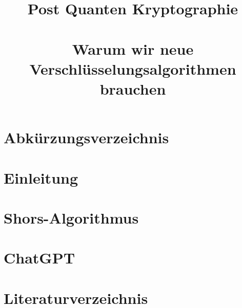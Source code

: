 \documentclass[conference]{IEEEtran}
\begin{document}

\title{Post Quanten Kryptographie\\
\large \ \\ \large Warum wir neue Verschlüsselungsalgorithmen brauchen}

\author{

  \and

}

\maketitle



\listoffigures
{}

\section*{Abkürzungsverzeichnis}


\section{Einleitung}


\section{Shors-Algorithmus}


\section{ChatGPT}


\section*{Literaturverzeichnis}
\printbibliography[heading=none]{}
\end{document}
